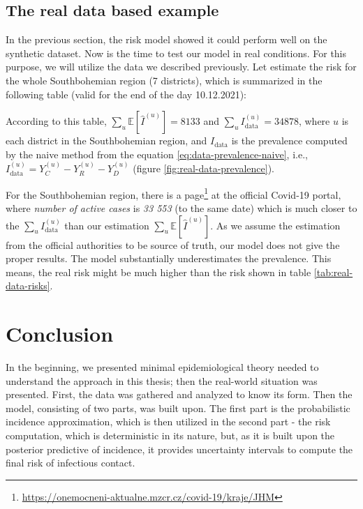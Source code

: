 \documentclass[
  digital, %
  oneside, %
  lof,     %
  lot,     %
]{fithesis4}
\begin{document}
\section{The real data based example}

In the previous section, the risk model showed it could perform well on the synthetic dataset.
Now is the time to test our model in real conditions.
For this purpose, we will utilize the data we described previously.
Let estimate the risk for the whole Southbohemian region (7 districts), which is summarized in the following table (valid for the end of the day 10.12.2021):



According to this table, $\sum_u \mathbb{E}[\hat{I}^{(u)}] = 8 133$ and $\sum_u I_\text{data}^{(u)} = 34 878$, where $u$ is each district in the Southbohemian region, and $I_\text{data}$ is the prevalence computed by the naive method from the equation \ref{eq:data-prevalence-naive}, i.e., $I_\text{data}^{(u)} = Y_C^{(u)} - Y_R^{(u)} - Y_D^{(u)}$ (figure \ref{fig:real-data-prevalence}).

For the Southbohemian region, there is a page\footnote{\url{https://onemocneni-aktualne.mzcr.cz/covid-19/kraje/JHM}} at the official Covid-19 portal, where \textit{number of active cases} is \textit{33 553} (to the same date) which is much closer to the $\sum_u I_\text{data}^{(u)}$ than our estimation $\sum_u \mathbb{E}[\hat{I}^{(u)}]$.
As we assume the estimation from the official authorities to be source of truth, our model does not give the proper results.
The model substantially underestimates the prevalence.
This means, the real risk might be much higher than the risk shown in table \ref{tab:real-data-risks}.


\chapter{Conclusion}

In the beginning, we presented minimal epidemiological theory needed to understand the approach in this thesis; then the real-world situation was presented.
First, the data was gathered and analyzed to know its form.
Then the model, consisting of two parts, was built upon.
The first part is the probabilistic incidence approximation, which is then utilized in the second part - the risk computation, which is deterministic in its nature, but, as it is built upon the posterior predictive of incidence, it provides uncertainty intervals to compute the final risk of infectious contact.
\end{document}
